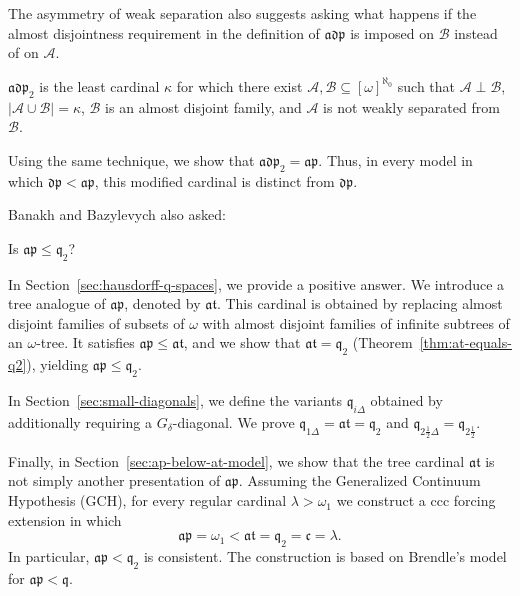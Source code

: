 The asymmetry of weak separation also suggests asking what happens if the
almost disjointness requirement in the definition of $\mathfrak{adp}$ is imposed
on $\mathcal B$ instead of on $\mathcal A$.

\begin{definition}
    $\mathfrak{adp}_2$ is the least cardinal $\kappa$ for which there exist $\mathcal A,\mathcal B\subseteq[\omega]^{\aleph_0}$ such that $\mathcal A\perp\mathcal B$, $|\mathcal A\cup\mathcal B|=\kappa$, $\mathcal B$ is an almost disjoint family, and $\mathcal A$ is not weakly separated from $\mathcal B$.
\end{definition}

Using the same technique, we show that $\mathfrak{adp}_2=\mathfrak{ap}$.
Thus, in every model in which $\mathfrak{dp}<\mathfrak{ap}$, this modified
cardinal is distinct from $\mathfrak{dp}$.

Banakh and Bazylevych also asked:

\begin{prob} Is $\mathfrak{ap}\leq\mathfrak q_2$?
\end{prob}

In Section~\ref{sec:hausdorff-q-spaces}, we provide a positive answer.
We introduce a tree analogue of
$\mathfrak{ap}$, denoted by $\mathfrak{at}$. This cardinal is obtained by
replacing almost disjoint families of subsets of $\omega$ with almost
disjoint families of infinite subtrees of an $\omega$-tree. It satisfies
$\mathfrak{ap}\leq\mathfrak{at}$, and we show that $\mathfrak{at}=\mathfrak q_2$ (Theorem~\ref{thm:at-equals-q2}), yielding $\mathfrak{ap}\leq\mathfrak q_2$.

In Section~\ref{sec:small-diagonals}, we define the variants
$\mathfrak q_{i\Delta}$ obtained by additionally requiring a
$G_\delta$-diagonal. We prove
$\mathfrak q_{1\Delta}=\mathfrak{at}=\mathfrak q_2$ and
$\mathfrak q_{2\frac{1}{2}\Delta}=\mathfrak q_{2\frac{1}{2}}$.

Finally, in Section~\ref{sec:ap-below-at-model}, we show that the tree cardinal
$\mathfrak{at}$ is not simply another presentation of $\mathfrak{ap}$.
Assuming the Generalized Continuum Hypothesis (GCH), for every regular cardinal $\lambda>\omega_1$ we construct a ccc
forcing extension in which
\[
    \mathfrak{ap}=\omega_1<
    \mathfrak{at}=\mathfrak q_{2}=\mathfrak c=\lambda.
\]
In particular, $\mathfrak{ap}<\mathfrak q_2$ is consistent.
The construction is based on Brendle's model for $\mathfrak{ap}<\mathfrak q$.

